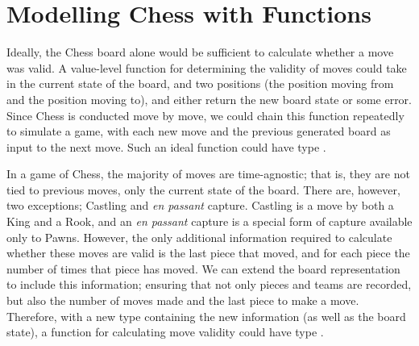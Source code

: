 
\section{Modelling Chess with Functions} \label{chesswithfunctions}

Ideally, the Chess board alone would be sufficient to calculate whether a move was valid. A value-level function for determining the validity of moves could take in the current state of the board, and two positions (the position moving from and the position moving to), and either return the new board state or some error. Since Chess is conducted move by move, we could chain this function repeatedly to simulate a game, with each new move and the previous generated board as input to the next move. Such an ideal function could have type .

In a game of Chess, the majority of moves are time-agnostic; that is, they are not tied to previous moves, only the current state of the board. There are, however, two exceptions; Castling and \emph{en passant} capture. Castling is a move by both a King and a Rook, and an \emph{en passant} capture is a special form of capture available only to Pawns. However, the only additional information required to calculate whether these moves are valid is the last piece that moved, and for each piece the number of times that piece has moved. We can extend the board representation to include this information; ensuring that not only pieces and teams are recorded, but also the number of moves made and the last piece to make a move. Therefore, with a new type  containing the new information (as well as the board state), a function for calculating move validity could have type .


